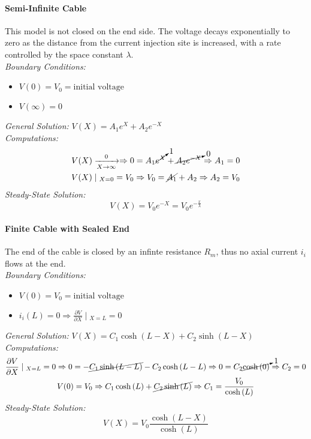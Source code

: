 \paragraph{Semi-Infinite Cable} This model is not closed on the end side. The voltage
decays exponentially to zero as the distance from the current injection site is increased,
with a rate controlled by the space constant \(\lambda\).\\
\textit{Boundary Conditions:}
\begin{itemize}
    \item \(V(0)=V_{0}=\text{initial voltage}\)
    \item \(V(\infty)=0\)
\end{itemize}
\textit{General Solution:} \(V(X)=A_{1}e^{X}+A_{2}e^{-X}\)\\
\textit{Computations:}
\begin{gather*}
    V(X)\xrightarrow[X\to{\infty}]{0}
    \Rightarrow{0=A_{1}\cancelto{1}{e^{X}}+\cancelto{0}{A_{2}e^{-X}}}
    \Rightarrow{A_{1}=0}\\
    V(X)\mid{}_{X=0}=V_{0}
    \Rightarrow{V_{0}=\cancel{A_{1}}+A_{2}}
    \Rightarrow{A_{2}=V_{0}}
\end{gather*}
\textit{Steady-State Solution:}
\begin{equation*}
    V(X)=V_{0}e^{-X}=V_{0}e^{-\frac{x}{\lambda}}
\end{equation*}
\paragraph{Finite Cable with Sealed End} The end of the cable is closed by an infinte
resistance \(R_{m}\), thus no axial current \(i_{i}\) flows at the end.\\
\textit{Boundary Conditions:}
\begin{itemize}
    \item \(V(0)=V_{0}=\text{initial voltage}\)
    \item \(i_{i}(L)=0\Rightarrow{\frac{\partial{V}}{\partial{X}}\mid{}_{X=L}=0}\)
\end{itemize}
\textit{General Solution:} \(V(X)=C_{1}\cosh{(L-X)}+C_{2}\sinh{(L-X)}\)\\
\textit{Computations:}
\begin{gather*}
    \frac{\partial{V}}{\partial{X}}\mid{}_{X=L}=0
    \Rightarrow{0=-\cancel{C_{1}\sinh{(L-L)}}-C_{2}\cosh{(L-L)}}
    \Rightarrow{0=C_{2}\cancelto{1}{\cosh{(0)}}}
    \Rightarrow{C_{2}=0}\\
    V(0)=V_{0}
    \Rightarrow{C_{1}\cosh{(L)}+\cancel{C_{2}\sinh{(L)}}}
    \Rightarrow{C_{1}=\frac{V_{0}}{\cosh{(L)}}}
\end{gather*}
\textit{Steady-State Solution:}
\begin{equation*}
    V(X)=V_{0}\frac{\cosh{(L-X)}}{\cosh{(L)}}
\end{equation*}
